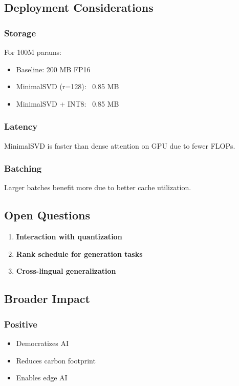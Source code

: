 \subsection{Deployment Considerations}

\subsubsection{Storage}
For 100M params:
\begin{itemize}
\item Baseline: 200 MB FP16
\item MinimalSVD (r=128): ~0.85 MB
\item MinimalSVD + INT8: ~0.85 MB

\end{itemize}
\subsubsection{Latency}
MinimalSVD is faster than dense attention on GPU due to fewer FLOPs.

\subsubsection{Batching}
Larger batches benefit more due to better cache utilization.

\subsection{Open Questions}

\begin{enumerate}
\item \textbf{Interaction with quantization}
\item \textbf{Rank schedule for generation tasks}
\item \textbf{Cross-lingual generalization}

\end{enumerate}
\subsection{Broader Impact}

\subsubsection{Positive}
\begin{itemize}
\item Democratizes AI
\item Reduces carbon footprint
\item Enables edge AI

\end{itemize}
